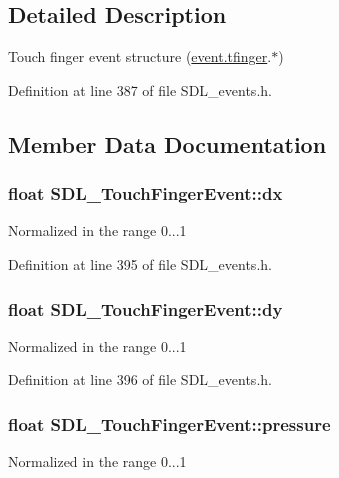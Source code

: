 \subsection{Detailed Description}
Touch finger event structure (\hyperlink{unionSDL__Event_ab18d7d60794cb056948ffa58541bc3c5}{event.\+tfinger}.$\ast$) 

Definition at line 387 of file S\+D\+L\+\_\+events.\+h.



\subsection{Member Data Documentation}
\hypertarget{structSDL__TouchFingerEvent_ac6acac209d6e2bd659fdb6760081393d}{
\subsubsection[{dx}]{\setlength{\rightskip}{0pt plus 5cm}float S\+D\+L\+\_\+\+Touch\+Finger\+Event\+::dx}}\label{structSDL__TouchFingerEvent_ac6acac209d6e2bd659fdb6760081393d}
Normalized in the range 0...1 

Definition at line 395 of file S\+D\+L\+\_\+events.\+h.

\hypertarget{structSDL__TouchFingerEvent_a9c0320c5f18a6b9d10da657e166608c9}{
\subsubsection[{dy}]{\setlength{\rightskip}{0pt plus 5cm}float S\+D\+L\+\_\+\+Touch\+Finger\+Event\+::dy}}\label{structSDL__TouchFingerEvent_a9c0320c5f18a6b9d10da657e166608c9}
Normalized in the range 0...1 

Definition at line 396 of file S\+D\+L\+\_\+events.\+h.

\hypertarget{structSDL__TouchFingerEvent_ab4fca822d0807b5748dbae8d3cc56524}{
\subsubsection[{pressure}]{\setlength{\rightskip}{0pt plus 5cm}float S\+D\+L\+\_\+\+Touch\+Finger\+Event\+::pressure}}\label{structSDL__TouchFingerEvent_ab4fca822d0807b5748dbae8d3cc56524}
Normalized in the range 0...1 

